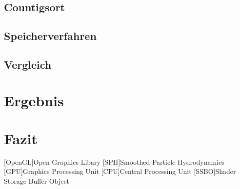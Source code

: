 \documentclass[intern,palatino]{cgBA}
\begin{document}

\subsection{Countigsort}


\subsection{Speicherverfahren}


\subsection{Vergleich}


\section{Ergebnis}


\section{Fazit}


\begin{acronym}
	[OpenGL]{Open Graphics Libary}
	[SPH]{Smoothed Particle Hydrodynamics}
	[GPU]{Graphics Processing Unit}
	[CPU]{Central Processing Unit}
	[SSBO]{Shader Storage Buffer Object}
\end{acronym}


\newpage
\listoffigures
\newpage

\end{document}
